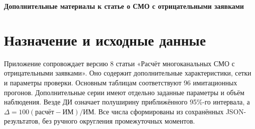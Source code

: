 \documentclass[a4paper,12pt]{article}
\begin{document}
\begin{center}\Large\bfseries Дополнительные материалы к статье о СМО с отрицательными заявками\end{center}
\section{Назначение и исходные данные}
Приложение сопровождает версию 8 статьи «Расчёт многоканальных СМО с отрицательными заявками». Оно содержит дополнительные характеристики, сетки и параметры проверки. Основным таблицам соответствуют 96 имитационных прогонов. Дополнительные серии имеют отдельно заданные параметры и объём наблюдения. Везде ДИ означает полуширину приближённого 95\%-го интервала, а \(\Delta=100(\text{расчёт}-\text{ИМ})/\text{ИМ}\). Все числа сформированы из сохранённых JSON-результатов, без ручного округления промежуточных моментов.
\end{document}
